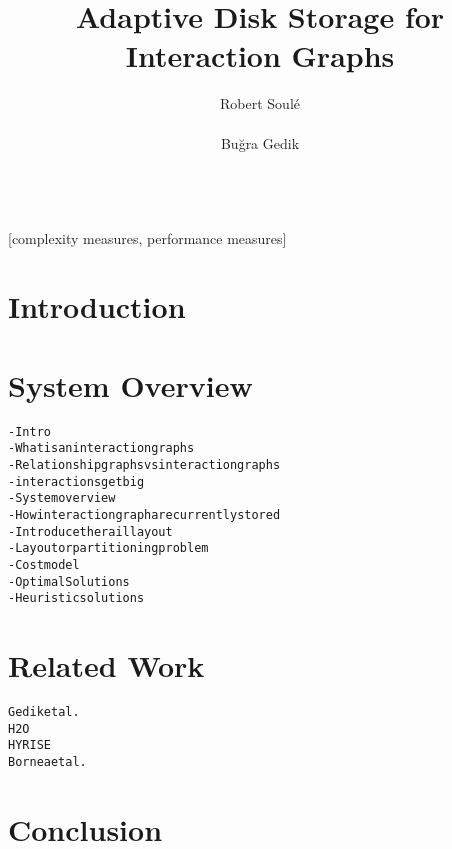 




%


\title{Adaptive Disk Storage for Interaction Graphs}


\author{
\alignauthor
Robert Soul\'{e}\\
       \\
\alignauthor
Bu\u{g}ra Gedik\\
       \\
}

\maketitle
\begin{abstract}
              
\end{abstract}

[complexity measures, performance measures]



\section{Introduction}

\section{System Overview}

\begin{alltt}\scriptsize
- Intro
    - What is an interaction graphs
    - Relationship graphs vs interaction graphs 
        - interactions get big
- System overview
    - How interaction graph are currently stored
    - Introduce the rail layout
- Layout or partitioning problem 
    - Cost model
- Optimal Solutions
- Heuristic solutions
\end{alltt}



\section{Related Work}

\begin{alltt}\scriptsize
Gedik et al.~\cite{gedik14}
H2O \cite{alagiannis14}
HYRISE~\cite{grund10}
Bornea et al.~\cite{bornea13}
\end{alltt}

\section{Conclusion}


  

